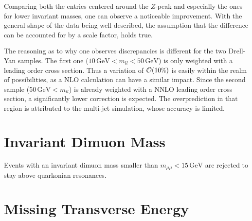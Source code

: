 \noindent Comparing both the entries centered around the $Z$-peak and especially the ones for lower invariant masses, one can observe a noticeable improvement. With the general shape of the data being well described, the assumption that the difference can be accounted for by a scale factor, holds true. 

The reasoning as to why one observes discrepancies is different for the two Drell-Yan samples. The first one ($10\,\text{GeV} < m_{ll} < 50\,\text{GeV}$) is only weighted with a leading order cross section. Thus a variation of $\mathcal{O}(10\pct)$ is easily within the realm of possibilities, as a NLO calculation can have a similar impact. Since the second sample ($50\,\text{GeV} < m_{ll}$) is already weighted with a NNLO leading order cross section, a significantly lower correction is expected. The overprediction in that region is attributed to the multi-jet simulation, whose accuracy is limited.


\section{Invariant Dimuon Mass}
\label{sec:m_mumu}

Events with an invariant dimuon mass smaller than $m_{\mu\mu} < 15\,\text{GeV}$ are rejected to stay above quarkonian resonances.





\section{Missing Transverse Energy}
\label{sec:met}

